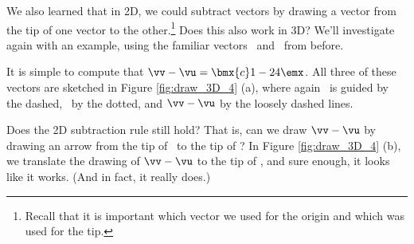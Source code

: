We also learned that in 2D, we could subtract vectors by drawing a vector from the tip of one vector to the other.\footnote{Recall that it is important which vector we used for the origin and which was used for the tip.} Does this also work in 3D? We'll investigate again with an example, using the familiar vectors \vv\ and \vu\ from before.\\

{It is simple to compute that $\vv-\vu = \bmx{c} 1\\-2\\4\emx$. All three of these vectors are sketched in Figure \ref{fig:draw_3D_4} (a), where again \vv\ is guided by the dashed, \vu\ by the dotted, and $\vv-\vu$ by the loosely dashed lines. 

Does the 2D subtraction rule still hold? That is, can we draw $\vv - \vu$ by drawing an arrow from the tip of \vu\ to the tip of \vv? In Figure \ref{fig:draw_3D_4} (b), we translate the drawing of $\vv-\vu$ to the tip of \vu, and sure enough, it looks like it works. (And in fact, it really does.)

\begin{figure}[h!]
\begin{center}
\end{center}
\end{figure}}
